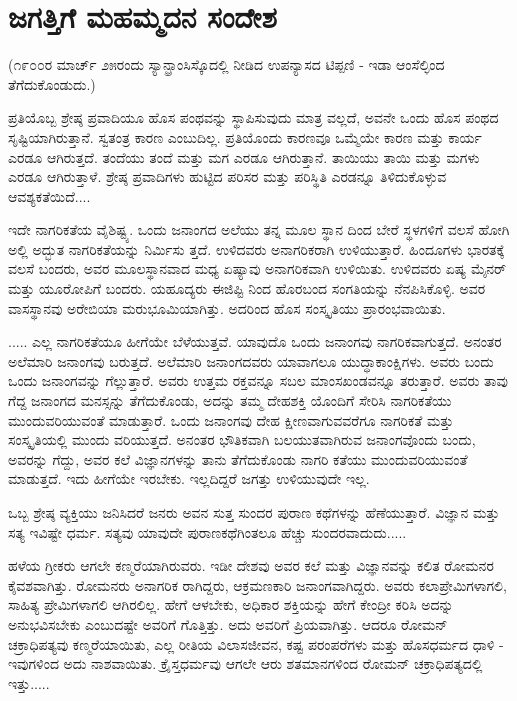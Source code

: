 
\chapter{ಜಗತ್ತಿಗೆ ಮಹಮ್ಮದನ ಸಂದೇಶ}

(೧೯೦೦ರ ಮಾರ್ಚ್ ೨೫ರಂದು ಸ್ಯಾನ್ಫ್ರಾಂಸಿಸ್ಕೊದಲ್ಲಿ ನೀಡಿದ ಉಪನ್ಯಾಸದ ಟಿಪ್ಪಣಿ - ಇಡಾ ಆಂಸೆಲ್ಳಿಂದ ತೆಗೆದುಕೊಂಡುದು.)

ಪ್ರತಿಯೊಬ್ಬ ಶ್ರೇಷ್ಠ ಪ್ರವಾದಿಯೂ ಹೊಸ ಪಂಥವನ್ನು ಸ್ಥಾಪಿಸುವುದು ಮಾತ್ರ ವಲ್ಲದೆ, ಅವನೇ ಒಂದು ಹೊಸ ಪಂಥದ ಸೃಷ್ಟಿಯಾಗಿರುತ್ತಾನೆ. ಸ್ವತಂತ್ರ ಕಾರಣ ಎಂಬುದಿಲ್ಲ. ಪ್ರತಿಯೊಂದು ಕಾರಣವೂ ಒಮ್ಮೆಯೇ ಕಾರಣ ಮತ್ತು ಕಾರ್ಯ ಎರಡೂ ಆಗಿರುತ್ತದೆ. ತಂದೆಯು ತಂದೆ ಮತ್ತು ಮಗ ಎರಡೂ ಆಗಿರುತ್ತಾನೆ. ತಾಯಿಯು ತಾಯಿ ಮತ್ತು ಮಗಳು ಎರಡೂ ಆಗಿರುತ್ತಾಳೆ. ಶ್ರೇಷ್ಠ ಪ್ರವಾದಿಗಳು ಹುಟ್ಟಿದ ಪರಿಸರ ಮತ್ತು ಪರಿಸ್ಥಿತಿ ಎರಡನ್ನೂ ತಿಳಿದುಕೊಳ್ಳುವ ಆವಶ್ಯಕತೆಯಿದೆ....

ಇದೇ ನಾಗರಿಕತೆಯ ವೈಶಿಷ್ಟ್ಯ. ಒಂದು ಜನಾಂಗದ ಅಲೆಯು ತನ್ನ ಮೂಲ ಸ್ಥಾನ ದಿಂದ ಬೇರೆ ಸ್ಥಳಗಳಿಗೆ ವಲಸೆ ಹೋಗಿ ಅಲ್ಲಿ ಅದ್ಭುತ ನಾಗರಿಕತೆಯನ್ನು ನಿರ್ಮಿಸು ತ್ತದೆ. ಉಳಿದವರು ಅನಾಗರಿಕರಾಗಿ ಉಳಿಯುತ್ತಾರೆ. ಹಿಂದೂಗಳು ಭಾರತಕ್ಕೆ ವಲಸೆ ಬಂದರು, ಅವರ ಮೂಲಸ್ಥಾನವಾದ ಮಧ್ಯ ಏಷ್ಯಾವು ಅನಾಗರಿಕವಾಗಿ ಉಳಿಯಿತು. ಉಳಿದವರು ಏಷ್ಯ ಮೈನರ್ ಮತ್ತು ಯೂರೋಪಿಗೆ ಬಂದರು. ಯಹೂದ್ಯರು ಈಜಿಪ್ಟಿ ನಿಂದ ಹೊರಬಂದ ಸಂಗತಿಯನ್ನು ನೆನಪಿಸಿಕೊಳ್ಳಿ. ಅವರ ವಾಸಸ್ಥಾನವು ಅರೇಬಿಯಾ ಮರುಭೂಮಿಯಾಗಿತ್ತು. ಅದರಿಂದ ಹೊಸ ಸಂಸ್ಕೃತಿಯು ಪ್ರಾರಂಭವಾಯಿತು.

..... ಎಲ್ಲ ನಾಗರಿಕತೆಯೂ ಹೀಗೆಯೇ ಬೆಳೆಯುತ್ತವೆ. ಯಾವುದೊ ಒಂದು ಜನಾಂಗವು ನಾಗರಿಕವಾಗುತ್ತದೆ. ಅನಂತರ ಅಲೆಮಾರಿ ಜನಾಂಗವು ಬರುತ್ತದೆ. ಅಲೆಮಾರಿ ಜನಾಂಗದವರು ಯಾವಾಗಲೂ ಯುದ್ಧಾಕಾಂಕ್ಷಿಗಳು. ಅವರು ಬಂದು ಒಂದು ಜನಾಂಗವನ್ನು ಗೆಲ್ಲುತ್ತಾರೆ. ಅವರು ಉತ್ತಮ ರಕ್ತವನ್ನೂ ಸಬಲ ಮಾಂಸಖಂಡವನ್ನೂ ತರುತ್ತಾರೆ. ಅವರು ತಾವು ಗೆದ್ದ ಜನಾಂಗದ ಮನಸ್ಸನ್ನು ತೆಗೆದುಕೊಂಡು, ಅದನ್ನು ತಮ್ಮ ದೇಹಶಕ್ತಿ ಯೊಂದಿಗೆ ಸೇರಿಸಿ ನಾಗರಿಕತೆಯು ಮುಂದುವರಿಯುವಂತೆ ಮಾಡುತ್ತಾರೆ. ಒಂದು ಜನಾಂಗವು ದೇಹ ಕ್ಷೀಣವಾಗುವವರೆಗೂ ನಾಗರಿಕತೆ ಮತ್ತು ಸಂಸ್ಕೃತಿಯಲ್ಲಿ ಮುಂದು ವರಿಯುತ್ತದೆ. ಅನಂತರ ಭೌತಿಕವಾಗಿ ಬಲಯುತವಾಗಿರುವ ಜನಾಂಗವೊಂದು ಬಂದು, ಅವರನ್ನು ಗೆದ್ದು, ಅವರ ಕಲೆ ವಿಜ್ಞಾನಗಳನ್ನು ತಾನು ತೆಗೆದುಕೊಂಡು ನಾಗರಿ ಕತೆಯು ಮುಂದುವರಿಯುವಂತೆ ಮಾಡುತ್ತದೆ. ಇದು ಹೀಗೆಯೇ ಇರಬೇಕು. ಇಲ್ಲದಿದ್ದರೆ ಜಗತ್ತು ಉಳಿಯುವುದೇ ಇಲ್ಲ.

\delimiter

ಒಬ್ಬ ಶ್ರೇಷ್ಠ ವ್ಯಕ್ತಿಯು ಜನಿಸಿದರೆ ಜನರು ಅವನ ಸುತ್ತ ಸುಂದರ ಪುರಾಣ ಕಥೆಗಳನ್ನು ಹೆಣೆಯುತ್ತಾರೆ. ವಿಜ್ಞಾನ ಮತ್ತು ಸತ್ಯ ಇವಿಷ್ಟೇ ಧರ್ಮ. ಸತ್ಯವು ಯಾವುದೇ ಪುರಾಣಕಥೆಗಿಂತಲೂ ಹೆಚ್ಚು ಸುಂದರವಾದುದು.....

ಹಳೆಯ ಗ್ರೀಕರು ಆಗಲೇ ಕಣ್ಮರೆಯಾಗಿರುವರು. ಇಡೀ ದೇಶವು ಅವರ ಕಲೆ ಮತ್ತು ವಿಜ್ಞಾನವನ್ನು ಕಲಿತ ರೋಮನರ ಕೈವಶವಾಗಿತ್ತು. ರೋಮನರು ಅನಾಗರಿಕ ರಾಗಿದ್ದರು, ಆಕ್ರಮಣಕಾರಿ ಜನಾಂಗವಾಗಿದ್ದರು. ಅವರು ಕಲಾಪ್ರೇಮಿಗಳಾಗಲಿ, ಸಾಹಿತ್ಯ ಪ್ರೇಮಿಗಳಾಗಲಿ ಆಗಿರಲಿಲ್ಲ. ಹೇಗೆ ಆಳಬೇಕು, ಅಧಿಕಾರ ಶಕ್ತಿಯನ್ನು ಹೇಗೆ ಕೇಂದ್ರೀ ಕರಿಸಿ ಅದನ್ನು ಅನುಭವಿಸಬೇಕು ಎಂಬುದಷ್ಟೇ ಅವರಿಗೆ ಗೊತ್ತಿತ್ತು. ಅದು ಅವರಿಗೆ ಪ್ರಿಯವಾಗಿತ್ತು. ಆದರೂ ರೋಮನ್ ಚಕ್ರಾಧಿಪತ್ಯವು ಕಣ್ಮರೆಯಾಯಿತು, ಎಲ್ಲ ರೀತಿಯ ವಿಲಾಸಜೀವನ, ಕಷ್ಟ ಪರಂಪರೆಗಳು ಮತ್ತು ಹೊಸಧರ್ಮದ ಧಾಳಿ - ಇವುಗಳಿಂದ ಅದು ನಾಶವಾಯಿತು. ಕ್ರೈಸ್ತಧರ್ಮವು ಆಗಲೇ ಆರು ಶತಮಾನಗಳಿಂದ ರೋಮನ್ ಚಕ್ರಾಧಿಪತ್ಯದಲ್ಲಿ ಇತ್ತು.....

